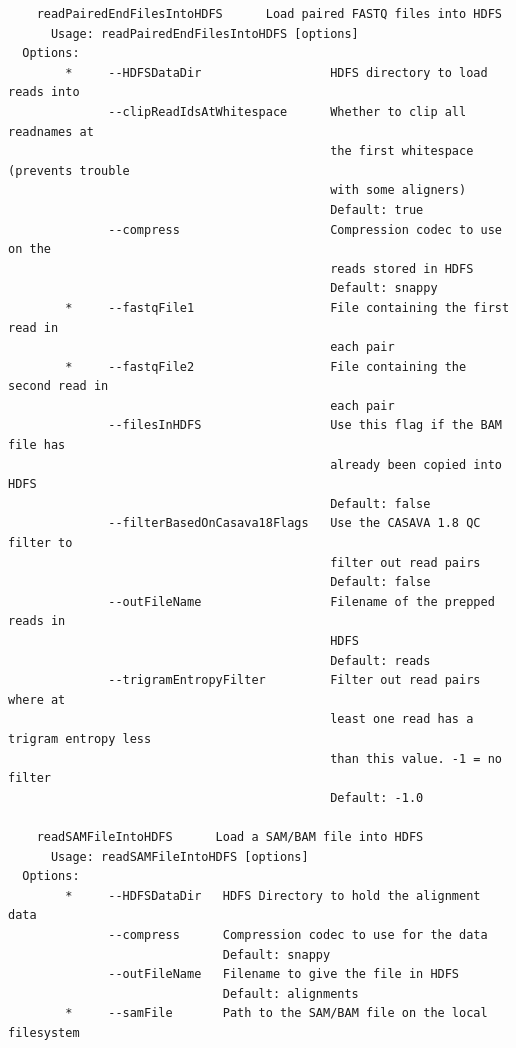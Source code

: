 \documentclass[11pt]{article}
\begin{document}
\begin{verbatim}
    readPairedEndFilesIntoHDFS      Load paired FASTQ files into HDFS
      Usage: readPairedEndFilesIntoHDFS [options]
  Options:
        *     --HDFSDataDir                  HDFS directory to load reads into
              --clipReadIdsAtWhitespace      Whether to clip all readnames at
                                             the first whitespace (prevents trouble
                                             with some aligners)
                                             Default: true
              --compress                     Compression codec to use on the
                                             reads stored in HDFS
                                             Default: snappy
        *     --fastqFile1                   File containing the first read in
                                             each pair
        *     --fastqFile2                   File containing the second read in
                                             each pair
              --filesInHDFS                  Use this flag if the BAM file has
                                             already been copied into HDFS
                                             Default: false
              --filterBasedOnCasava18Flags   Use the CASAVA 1.8 QC filter to
                                             filter out read pairs
                                             Default: false
              --outFileName                  Filename of the prepped reads in
                                             HDFS
                                             Default: reads
              --trigramEntropyFilter         Filter out read pairs where at
                                             least one read has a trigram entropy less
                                             than this value. -1 = no filter
                                             Default: -1.0

    readSAMFileIntoHDFS      Load a SAM/BAM file into HDFS
      Usage: readSAMFileIntoHDFS [options]
  Options:
        *     --HDFSDataDir   HDFS Directory to hold the alignment data
              --compress      Compression codec to use for the data
                              Default: snappy
              --outFileName   Filename to give the file in HDFS
                              Default: alignments
        *     --samFile       Path to the SAM/BAM file on the local filesystem


\end{verbatim}
\end{document}
